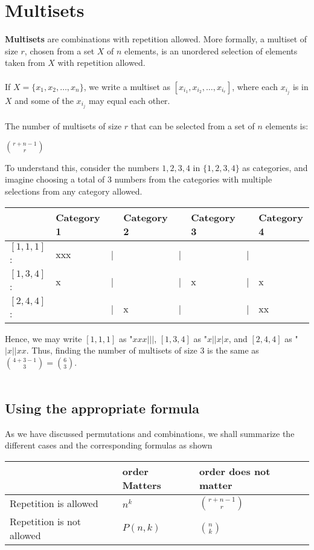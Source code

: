 \documentclass[a4paper]{article}
\begin{document}
\section{Multisets}
\textbf{Multisets} are combinations with repetition allowed. More formally, a multiset of size $r$, chosen from a set $X$ of $n$ elements, is an unordered selection of elements taken from $X$ with repetition allowed.\\\\
If $X=\{x_1, x_2,\dots,x_n\}$, we write a multiset as $[x_{i_1}, x_{i_2}, \dots, x_{i_r}]$, where each $x_{i_j}$ is in $X$ and some of the $x_{i_j}$ may equal each other.\\\\
The number of multisets of size $r$ that can be selected from a set of $n$ elements is:
\begin{center}
	$r+n-1\choose r$
\end{center}
To understand this, consider the numbers $1,2,3,4$ in $\{1,2,3,4\}$ as categories, and imagine choosing a total of $3$ numbers from the categories with multiple selections from any category allowed.
\begin{center}
\begin{tabular}{ | m{2cm} | m{2cm} m{0.1cm} m{2cm} m{0.1cm} m{2cm} m{0.1cm} m{2cm} | }
	\hline
	& Category 1 && Category 2 && Category 3 && Category 4 \\
	\hline
	$[1,1,1]$: & xxx &|& &|& &|& \\ 
	\hline
	$[1,3,4]$: & x &|& &|& x &|& x \\
	\hline
	$[2,4,4]$: & &|& x &|& &|& xx\\
	\hline
\end{tabular}
\end{center}
Hence, we may write $[1,1,1]$ as "$xxx|||$, $[1,3,4]$ as "$x||x|x$, and $[2,4,4]$ as "$|x||xx$. Thus, finding the number of multisets of size 3 is the same as ${4 + 3 - 1 \choose 3} = {6\choose 3}$.\\\\

\subsection{Using the appropriate formula}
As we have discussed permutations and combinations, we shall summarize the different cases and the corresponding formulas as shown
\begin{center}
\begin{tabular}{ | m{4cm} | m{4cm} m{4cm} | }
	\hline 
	& order Matters & order does not matter\\
	\hline
	Repetition is allowed & $n^k$ & $r+n-1\choose r$\\
	Repetition is not allowed & $P(n,k)$ & $n\choose k$\\
	\hline	
\end{tabular}
\end{center}
\end{document}
